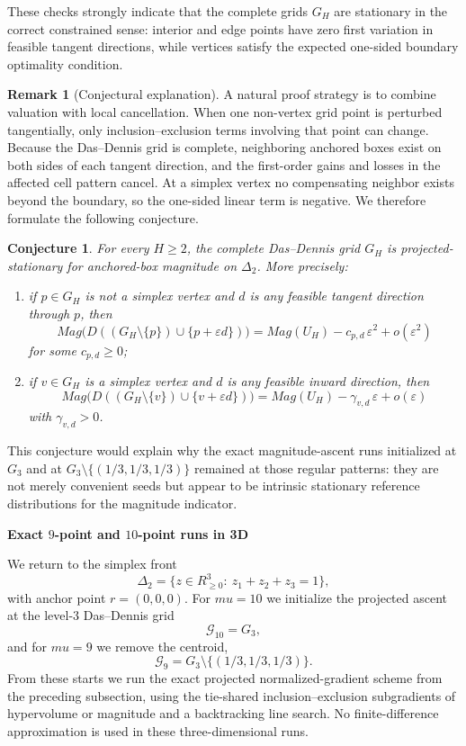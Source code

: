 \documentclass{article}
\def\mu{mu}%
\def\Mag{Mag}%
\def\R{R}%
\newtheorem{conjecture}[theorem]{Conjecture}
\theoremstyle{definition}
\newtheorem{remark}[theorem]{Remark}
\newcommand{\Mag}{\operatorname{Mag}}
\newcommand{\R}{\mathbb{R}}
\newcommand{\1}{\mathbf{1}}
\newcommand{\myparagraph}[1]{\medskip\noindent\textbf{#1}}
\begin{document}
These checks strongly indicate that the complete grids $G_H$ are stationary in the correct constrained sense: interior and edge points have zero first variation in feasible tangent directions, while vertices satisfy the expected one-sided boundary optimality condition.

\begin{remark}[Conjectural explanation]
A natural proof strategy is to combine valuation with local cancellation. When one non-vertex grid point is perturbed tangentially, only inclusion--exclusion terms involving that point can change. Because the Das--Dennis grid is complete, neighboring anchored boxes exist on both sides of each tangent direction, and the first-order gains and losses in the affected cell pattern cancel. At a simplex vertex no compensating neighbor exists beyond the boundary, so the one-sided linear term is negative. We therefore formulate the following conjecture.
\end{remark}

\begin{conjecture}
For every $H\ge 2$, the complete Das--Dennis grid $G_H$ is projected-stationary for anchored-box magnitude on $\Delta_2$. More precisely:
\begin{enumerate}[leftmargin=2em]
\item if $p\in G_H$ is not a simplex vertex and $d$ is any feasible tangent direction through $p$, then
\[
\Mag\bigl(D((G_H\setminus\{p\})\cup\{p+\varepsilon d\})\bigr)
=
\Mag(U_H)-c_{p,d}\,\varepsilon^2+o(\varepsilon^2)
\]
for some $c_{p,d}\ge 0$;
\item if $v\in G_H$ is a simplex vertex and $d$ is any feasible inward direction, then
\[
\Mag\bigl(D((G_H\setminus\{v\})\cup\{v+\varepsilon d\})\bigr)
=\Mag(U_H)-\gamma_{v,d}\,\varepsilon+o(\varepsilon)
\]
with $\gamma_{v,d}>0$.
\end{enumerate}
\end{conjecture}

This conjecture would explain why the exact magnitude-ascent runs initialized at $G_3$ and at $G_3\setminus\{(1/3,1/3,1/3)\}$ remained at those regular patterns: they are not merely convenient seeds but appear to be intrinsic stationary reference distributions for the magnitude indicator.


\myparagraph{Exact $9$-point and $10$-point runs in 3D}

We return to the simplex front
\[
\Delta_2=\{z\in\R_{\ge 0}^3:\ z_1+z_2+z_3=1\},
\]
with anchor point $r=(0,0,0)$. For $\mu=10$ we initialize the projected ascent at the level-$3$ Das--Dennis grid
\[
\mathcal G_{10}=G_3,
\]
and for $\mu=9$ we remove the centroid,
\[
\mathcal G_9=G_3\setminus\{(1/3,1/3,1/3)\}.
\]
From these starts we run the exact projected normalized-gradient scheme from the preceding subsection, using the tie-shared inclusion--exclusion subgradients of hypervolume or magnitude and a backtracking line search. No finite-difference approximation is used in these three-dimensional runs.
\end{document}
